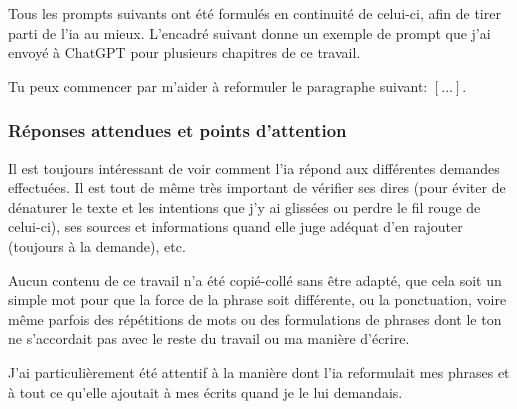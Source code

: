 Tous les prompts suivants ont été formulés en continuité de celui-ci, afin de tirer parti de l'\acrshort{ia} au mieux.
L'encadré suivant donne un exemple de prompt que j'ai envoyé à ChatGPT pour plusieurs chapitres de ce travail.
\begin{boxitup}
Tu peux commencer par m'aider à reformuler le paragraphe suivant: $[...]$.
\end{boxitup}

\subsubsection{Réponses attendues et points d'attention}
Il est toujours intéressant de voir comment l'\acrshort{ia} répond aux différentes demandes effectuées.
Il est tout de même très important de vérifier ses dires (pour éviter de dénaturer le texte et les intentions que j'y ai glissées ou perdre le fil rouge de celui-ci), ses sources et informations quand elle juge adéquat d'en rajouter (toujours à la demande), etc.

Aucun contenu de ce travail n'a été copié-collé sans être adapté, que cela soit un simple mot pour que la force de la phrase soit différente, ou la ponctuation, voire même parfois des répétitions de mots ou des formulations de phrases dont le ton ne s'accordait pas avec le reste du travail ou ma manière d'écrire.

J'ai particulièrement été attentif à la manière dont l'\acrshort{ia} reformulait mes phrases et à tout ce qu'elle ajoutait à mes écrits quand je le lui demandais.
